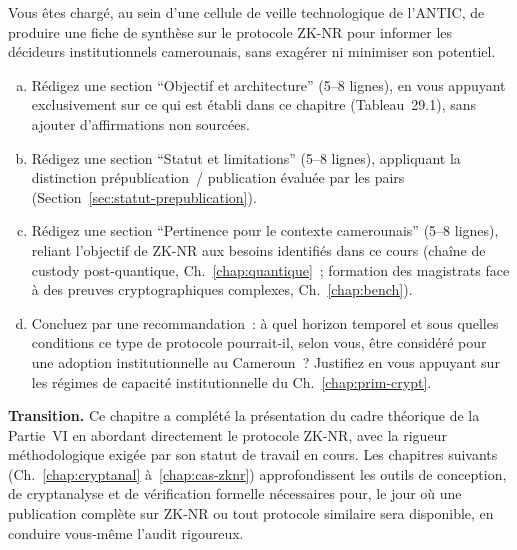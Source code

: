 \begin{boxexo}[title={\ding{45}\quad Exercice~29.3. Rédiger une fiche de veille technologique \niveauexpert}]
Vous êtes chargé, au sein d'une cellule de veille technologique de
l'ANTIC, de produire une fiche de synthèse sur le protocole ZK-NR
pour informer les décideurs institutionnels camerounais, sans
exagérer ni minimiser son potentiel.
\begin{enumerate}[(a)]
    \item Rédigez une section ``Objectif et architecture'' (5--8
          lignes), en vous appuyant exclusivement sur ce qui est
          établi dans ce chapitre (Tableau~29.1), sans ajouter
          d'affirmations non sourcées.
    \item Rédigez une section ``Statut et limitations'' (5--8
          lignes), appliquant la distinction prépublication~/
          publication évaluée par les pairs
          (Section~\ref{sec:statut-prepublication}).
    \item Rédigez une section ``Pertinence pour le contexte
          camerounais'' (5--8 lignes), reliant l'objectif de
          ZK-NR aux besoins identifiés dans ce cours (chaîne de
          custody post-quantique, Ch.~\ref{chap:quantique}~;
          formation des magistrats face à des preuves
          cryptographiques complexes, Ch.~\ref{chap:bench}).
    \item Concluez par une recommandation~: à quel horizon
          temporel et sous quelles conditions ce type de protocole
          pourrait-il, selon vous, être considéré pour une
          adoption institutionnelle au Cameroun~? Justifiez en
          vous appuyant sur les régimes de capacité institutionnelle
          du Ch.~\ref{chap:prim-crypt}.
\end{enumerate}
\end{boxexo}

\bigskip

\begin{boxinfo}
\textbf{Transition.} Ce chapitre a complété la présentation du
cadre théorique de la Partie~VI en abordant directement le
protocole ZK-NR, avec la rigueur méthodologique exigée par son
statut de travail en cours. Les chapitres suivants
(Ch.~\ref{chap:cryptanal} à~\ref{chap:cas-zknr}) approfondissent
les outils de conception, de cryptanalyse et de vérification
formelle nécessaires pour, le jour où une publication complète
sur ZK-NR ou tout protocole similaire sera disponible, en conduire
vous-même l'audit rigoureux.
\end{boxinfo}